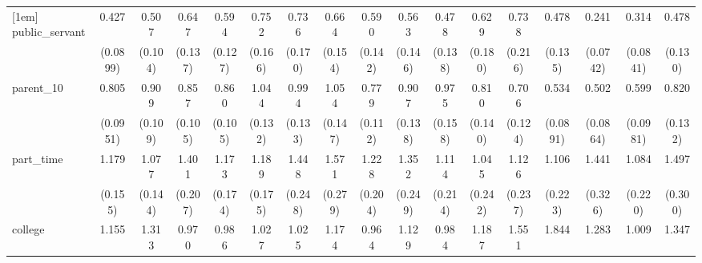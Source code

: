 {\begin{tabular}{l*{16}{c}}
[1em]
public\_servant      &       0.427\sym{***}&       0.507\sym{***}&       0.647\sym{*}  &       0.594\sym{*}  &       0.752         &       0.736         &       0.664         &       0.590\sym{*}  &       0.563\sym{*}  &       0.478\sym{*}  &       0.629         &       0.738         &       0.478\sym{**} &       0.241\sym{***}&       0.314\sym{***}&       0.478\sym{**} \\
                    &    (0.0899)         &     (0.104)         &     (0.137)         &     (0.127)         &     (0.166)         &     (0.170)         &     (0.154)         &     (0.142)         &     (0.146)         &     (0.138)         &     (0.180)         &     (0.216)         &     (0.135)         &    (0.0742)         &    (0.0841)         &     (0.130)         \\
[1em]
parent\_10           &       0.805         &       0.909         &       0.857         &       0.860         &       1.044         &       0.994         &       1.054         &       0.779         &       0.907         &       0.975         &       0.810         &       0.706\sym{*}  &       0.534\sym{***}&       0.502\sym{***}&       0.599\sym{**} &       0.820         \\
                    &    (0.0951)         &     (0.109)         &     (0.105)         &     (0.105)         &     (0.132)         &     (0.133)         &     (0.147)         &     (0.112)         &     (0.138)         &     (0.158)         &     (0.140)         &     (0.124)         &    (0.0891)         &    (0.0864)         &    (0.0981)         &     (0.132)         \\
[1em]
part\_time           &       1.179         &       1.077         &       1.401\sym{*}  &       1.173         &       1.189         &       1.448\sym{*}  &       1.571\sym{*}  &       1.228         &       1.352         &       1.114         &       1.045         &       1.126         &       1.106         &       1.441         &       1.084         &       1.497\sym{*}  \\
                    &     (0.155)         &     (0.144)         &     (0.207)         &     (0.174)         &     (0.175)         &     (0.248)         &     (0.279)         &     (0.204)         &     (0.249)         &     (0.214)         &     (0.242)         &     (0.237)         &     (0.223)         &     (0.326)         &     (0.220)         &     (0.300)         \\
[1em]
college             &       1.155         &       1.313         &       0.970         &       0.986         &       1.027         &       1.025         &       1.174         &       0.964         &       1.129         &       0.984         &       1.187         &       1.551\sym{*}  &       1.844\sym{**} &       1.283         &       1.009         &       1.347         \\

\end{tabular}}
